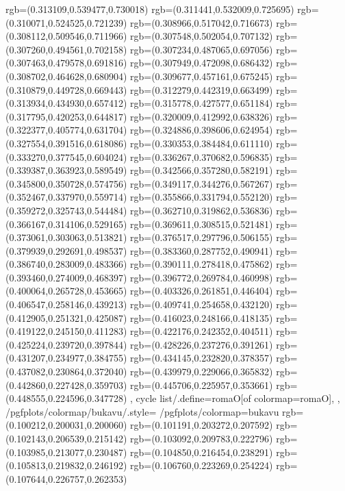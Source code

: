 {{{			rgb=(0.313109,0.539477,0.730018)
			rgb=(0.311441,0.532009,0.725695)
			rgb=(0.310071,0.524525,0.721239)
			rgb=(0.308966,0.517042,0.716673)
			rgb=(0.308112,0.509546,0.711966)
			rgb=(0.307548,0.502054,0.707132)
			rgb=(0.307260,0.494561,0.702158)
			rgb=(0.307234,0.487065,0.697056)
			rgb=(0.307463,0.479578,0.691816)
			rgb=(0.307949,0.472098,0.686432)
			rgb=(0.308702,0.464628,0.680904)
			rgb=(0.309677,0.457161,0.675245)
			rgb=(0.310879,0.449728,0.669443)
			rgb=(0.312279,0.442319,0.663499)
			rgb=(0.313934,0.434930,0.657412)
			rgb=(0.315778,0.427577,0.651184)
			rgb=(0.317795,0.420253,0.644817)
			rgb=(0.320009,0.412992,0.638326)
			rgb=(0.322377,0.405774,0.631704)
			rgb=(0.324886,0.398606,0.624954)
			rgb=(0.327554,0.391516,0.618086)
			rgb=(0.330353,0.384484,0.611110)
			rgb=(0.333270,0.377545,0.604024)
			rgb=(0.336267,0.370682,0.596835)
			rgb=(0.339387,0.363923,0.589549)
			rgb=(0.342566,0.357280,0.582191)
			rgb=(0.345800,0.350728,0.574756)
			rgb=(0.349117,0.344276,0.567267)
			rgb=(0.352467,0.337970,0.559714)
			rgb=(0.355866,0.331794,0.552120)
			rgb=(0.359272,0.325743,0.544484)
			rgb=(0.362710,0.319862,0.536836)
			rgb=(0.366167,0.314106,0.529165)
			rgb=(0.369611,0.308515,0.521481)
			rgb=(0.373061,0.303063,0.513821)
			rgb=(0.376517,0.297796,0.506155)
			rgb=(0.379939,0.292691,0.498537)
			rgb=(0.383360,0.287752,0.490941)
			rgb=(0.386740,0.283009,0.483366)
			rgb=(0.390111,0.278418,0.475862)
			rgb=(0.393460,0.274009,0.468397)
			rgb=(0.396772,0.269784,0.460998)
			rgb=(0.400064,0.265728,0.453665)
			rgb=(0.403326,0.261851,0.446404)
			rgb=(0.406547,0.258146,0.439213)
			rgb=(0.409741,0.254658,0.432120)
			rgb=(0.412905,0.251321,0.425087)
			rgb=(0.416023,0.248166,0.418135)
			rgb=(0.419122,0.245150,0.411283)
			rgb=(0.422176,0.242352,0.404511)
			rgb=(0.425224,0.239720,0.397844)
			rgb=(0.428226,0.237276,0.391261)
			rgb=(0.431207,0.234977,0.384755)
			rgb=(0.434145,0.232820,0.378357)
			rgb=(0.437082,0.230864,0.372040)
			rgb=(0.439979,0.229066,0.365832)
			rgb=(0.442860,0.227428,0.359703)
			rgb=(0.445706,0.225957,0.353661)
			rgb=(0.448555,0.224596,0.347728)
		},
	cycle list/.define={romaO}{[of colormap=romaO]},
	},
	/pgfplots/colormap/bukavu/.style={
		/pgfplots/colormap={bukavu}{%
			rgb=(0.100212,0.200031,0.200060)
			rgb=(0.101191,0.203272,0.207592)
			rgb=(0.102143,0.206539,0.215142)
			rgb=(0.103092,0.209783,0.222796)
			rgb=(0.103985,0.213077,0.230487)
			rgb=(0.104850,0.216454,0.238291)
			rgb=(0.105813,0.219832,0.246192)
			rgb=(0.106760,0.223269,0.254224)
			rgb=(0.107644,0.226757,0.262353)
}}}
